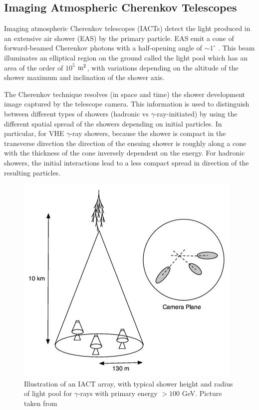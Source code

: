 \documentclass[main.tex]{subfiles}
\begin{document}
\subsection{Imaging Atmospheric Cherenkov Telescopes}
Imaging atmospheric Cherenkov telescopes (IACTs) detect the light produced in an extensive air shower (EAS) by the primary particle. EAS emit a cone of forward-beamed Cherenkov photons with a half-opening angle of $\sim 1^\circ$ \cite{antonelli2009}. This beam illuminates an elliptical region on the ground called the light pool which has an area of the order of $10^5$ $\textrm{m}^2$, with variations depending on the altitude of the shower maximum and inclination of the shower axis. \par
The Cherenkov technique resolves (in space and time) the shower development image captured by the telescope camera. This information is used to distinguish between different types of showers (hadronic vs $\gamma$-ray-initiated) by using the different spatial spread of the showers depending on initial particles. In particular, for VHE $\gamma$-ray showers, because the shower is compact in the transverse direction the direction of the ensuing shower is roughly along a cone with the thickness of the cone inversely dependent on the energy.%
 For hadronic showers, the initial interactions lead to a less compact spread in direction of the resulting particles.\par
\begin{figure}[htbp]
  \centering
  \includegraphics[width=0.68\linewidth]{images/IACT}
  \caption[Illustration of an IACT array.]{Illustration of an IACT array, with typical shower height and radius of light pool for $\gamma$-rays with primary energy $>100$ GeV. Picture taken from \cite{veritas_web}}
  \label{fig:IACT}
\end{figure}
\end{document}
